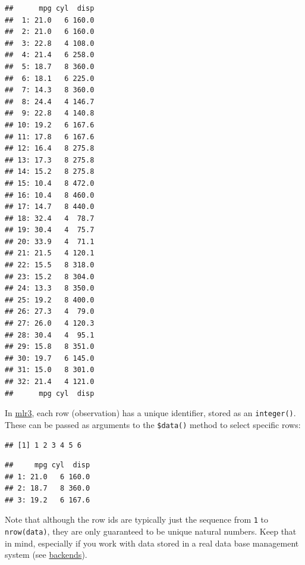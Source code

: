\documentclass[
]{scrbook}
\newenvironment{Shaded}{\begin{snugshade}}{\end{snugshade}}
\newcommand{\AttributeTok}[1]{\textcolor[rgb]{0.77,0.63,0.00}{#1}}
\newcommand{\CommentTok}[1]{\textcolor[rgb]{0.56,0.35,0.01}{\textit{#1}}}
\newcommand{\DecValTok}[1]{\textcolor[rgb]{0.00,0.00,0.81}{#1}}
\newcommand{\FunctionTok}[1]{\textcolor[rgb]{0.00,0.00,0.00}{#1}}
\newcommand{\NormalTok}[1]{#1}
\newcommand{\SpecialCharTok}[1]{\textcolor[rgb]{0.00,0.00,0.00}{#1}}
\renewenvironment{Shaded} {\begin{snugshade}\small} {\end{snugshade}}
\begin{document}
\begin{verbatim}
##      mpg cyl  disp
##  1: 21.0   6 160.0
##  2: 21.0   6 160.0
##  3: 22.8   4 108.0
##  4: 21.4   6 258.0
##  5: 18.7   8 360.0
##  6: 18.1   6 225.0
##  7: 14.3   8 360.0
##  8: 24.4   4 146.7
##  9: 22.8   4 140.8
## 10: 19.2   6 167.6
## 11: 17.8   6 167.6
## 12: 16.4   8 275.8
## 13: 17.3   8 275.8
## 14: 15.2   8 275.8
## 15: 10.4   8 472.0
## 16: 10.4   8 460.0
## 17: 14.7   8 440.0
## 18: 32.4   4  78.7
## 19: 30.4   4  75.7
## 20: 33.9   4  71.1
## 21: 21.5   4 120.1
## 22: 15.5   8 318.0
## 23: 15.2   8 304.0
## 24: 13.3   8 350.0
## 25: 19.2   8 400.0
## 26: 27.3   4  79.0
## 27: 26.0   4 120.3
## 28: 30.4   4  95.1
## 29: 15.8   8 351.0
## 30: 19.7   6 145.0
## 31: 15.0   8 301.0
## 32: 21.4   4 121.0
##      mpg cyl  disp
\end{verbatim}

In \href{https://mlr3.mlr-org.com}{mlr3}, each row (observation) has a unique identifier, stored as an \texttt{integer()}.
These can be passed as arguments to the \texttt{\$data()} method to select specific rows:

\begin{Shaded}
\end{Shaded}

\begin{verbatim}
## [1] 1 2 3 4 5 6
\end{verbatim}

\begin{Shaded}
\end{Shaded}

\begin{verbatim}
##     mpg cyl  disp
## 1: 21.0   6 160.0
## 2: 18.7   8 360.0
## 3: 19.2   6 167.6
\end{verbatim}

Note that although the row ids are typically just the sequence from \texttt{1} to \texttt{nrow(data)}, they are only guaranteed to be unique natural numbers.
Keep that in mind, especially if you work with data stored in a real data base management system (see \protect\hyperlink{backends}{backends}).
\end{document}

